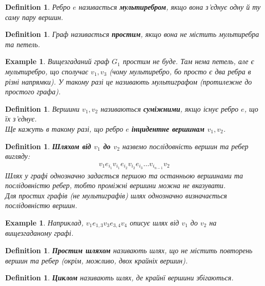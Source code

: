 \documentclass[a4paper, 14pt]{extarticle}
\theoremstyle{theoremdd}
\theoremstyle{theoremdd}
\newtheorem{definition}[theorem]{Definition}
\theoremstyle{theoremdd}
\theoremstyle{theoremdd}
\theoremstyle{theoremdd}
\newtheorem{example}[theorem]{Example}
\theoremstyle{theoremdd}
\theoremstyle{theoremdd}
\theoremstyle{theoremdd}
\theoremstyle{theoremdd}
\theoremstyle{theoremdd}
\theoremstyle{theoremdd}
\theoremstyle{theoremdd}
\theoremstyle{theoremdd}
\theoremstyle{theoremdd}
\theoremstyle{theoremdd}
\begin{document}
\begin{definition}
Ребро $e$ називається \textbf{мультиребром}, якщо вона з'єднує одну й ту саму пару вершин.
\end{definition}

\begin{definition}
Граф називається \textbf{простим}, якщо вона не містить мультиребра та петель.
\end{definition}

\begin{example}
Вищезгаданий граф $G_1$ простим не буде. Там нема петель, але є мультиребро, що сполучає $v_1,v_3$ (чому мультиребро, бо просто є два ребра в різні напрямки). У такому разі це називають мультиграфом (протилежне до простого графа).
\end{example}

\begin{definition}
Вершини $v_1,v_2$ називаються \textbf{суміжними}, якщо існує ребро $e$, що їх з'єднує.\\
Ще кажуть в такому разі, що ребро $e$ \textbf{інцидентне вершинам $v_1,v_2$}. 
\end{definition}

\begin{definition}
\textbf{Шляхом від $v_1$ до $v_2$} назвемо послідовність вершин та ребер вигляду:
\begin{align*}
v_1 e_{i_1} v_{i_1} e_{i_2} v_{i_2} e_{i_3} \dots v_{i_{n-1}} v_2
\end{align*}
Шлях у графі однозначно задається першою та останньою вершинами та послідовністю ребер, тобто проміжні вершини можна не вказувати.\\
Для простих графів (не мультиграфів) шлях однозначно визначається послідовністю вершин.
\end{definition}

\begin{example}
Наприклад, $v_1 e_{1,3} v_3 e_{3,4} v_4$ описує шлях від $v_1$ до $v_2$ на вищезгаданому графі.
\end{example}

\begin{definition}
\textbf{Простим шляхом} називають шлях, що не містить повторень вершин та ребер (окрім, можливо, двох крайніх вершин).
\end{definition}

\begin{definition}
\textbf{Циклом} називають шлях, де крайнї вершини збігаються.
\end{definition}
\end{document}

